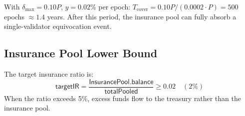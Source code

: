 With $\delta_{\max} = 0.10P$, $y = 0.02\%$ per epoch: $T_{\text{cover}} = 0.10P / (0.0002 \cdot P) = 500$ epochs $\approx 1.4$ years. After this period, the insurance pool can fully absorb a single-validator equivocation event.

\subsection{Insurance Pool Lower Bound}

\begin{definition}
The target insurance ratio is:
\begin{equation}
    \mathsf{targetIR} = \frac{\mathsf{InsurancePool.balance}}{\mathsf{totalPooled}} \geq 0.02 \quad (2\%)
\end{equation}
When the ratio exceeds 5\%, excess funds flow to the treasury rather than the insurance pool.
\end{definition}

